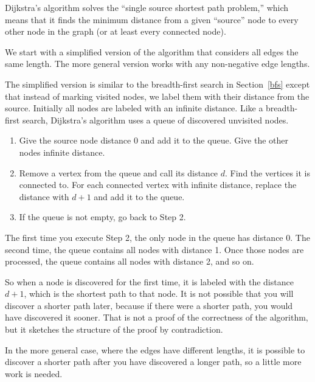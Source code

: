 \documentclass[10pt]{book}
\begin{document}
Dijkstra's algorithm solves the ``single source shortest path problem,''
which means that it finds the minimum distance from a given ``source''
node to every other node in the graph (or at least every connected
node).

We start with a simplified version of the algorithm that
considers all edges the same length.  The more general version
works with any non-negative edge lengths.

The simplified version is similar to the breadth-first search
in Section~\ref{bfs} except that instead of marking visited nodes,
we label them with their distance from the source.  Initially
all nodes are labeled with an infinite distance.  Like a
breadth-first search, Dijkstra's algorithm uses a queue of
discovered unvisited nodes.

\begin{enumerate}

\item Give the source node distance 0 and add it to the queue.
Give the other nodes infinite distance.

\item Remove a vertex from the queue and call its distance $d$.  Find
  the vertices it is connected to.  For each connected vertex
  with infinite distance, replace the distance with $d+1$ and
  add it to the queue.

\item If the queue is not empty, go back to Step 2.

\end{enumerate}

The first time you execute Step 2, the only node in the queue
has distance 0.  The second time, the queue contains all
nodes with distance 1.  Once those nodes are processed, the
queue contains all nodes with distance 2, and so on.

So when a node is discovered for the first time, it is labeled
with the distance $d+1$, which is the shortest path to that
node.  It is not possible that you will discover a shorter
path later, because if there were a shorter path, you would
have discovered it sooner.  That is not a proof
of the correctness of the algorithm, but it sketches
the structure of the proof by contradiction.

In the more general case, where the edges have different lengths,
it is possible to discover a shorter path after you have
discovered a longer path, so a little more work is needed.
\end{document}
